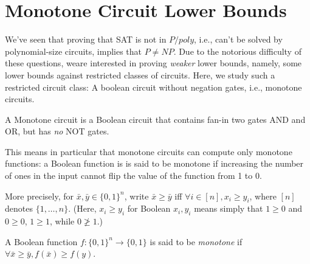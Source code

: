 %
%
%





\chapter{Monotone Circuit Lower Bounds}
\label{sec:Razborov} %



We've seen that proving that SAT is not in $P/poly$, i.e., can't be solved by polynomial-size circuits, implies that $P \neq NP$.
Due to the notorious difficulty of these questions, weare interested in proving \emph{weaker} lower bounds, namely, some lower bounds against restricted classes of circuits. 
Here, we study such a restricted circuit class: A boolean circuit without negation gates, i.e., monotone circuits.

\begin{definition}
A Monotone circuit is a Boolean circuit that contains fan-in two gates AND and OR, but has \emph{no} NOT gates.
\end{definition}

This means in particular that monotone circuits can compute only monotone functions: a Boolean function is is said to be monotone if increasing the number of ones in the input cannot flip the value of the function from 1 to 0. 

More precisely, for $\bar{x}, \bar{y} \in\{0,1\}^n$, write $\bar{x} \geqslant \bar{y}$ iff $ \forall i \in [n], x_i \geqslant y_i$, where $[n]$ denotes $\{1,\dots,n\}$. (Here, $x_i\ge y_i$ for Boolean $x_i,y_i$ means simply that $1\ge 0$ and $0\ge 0$, $1\ge 1$, while $0\not\ge 1$.)

\begin{definition}
A Boolean function $f:\{0,1\}^n \rightarrow\{0,1\}$ is said to be  \emph{monotone} if $\forall \bar{x} \geq \bar{y}, f(\bar{x}) \geqslant f(y)$.
\end{definition}


